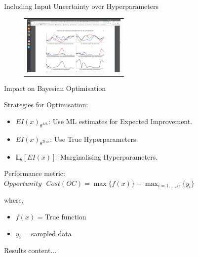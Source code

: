 \documentclass{beamer}
\begin{document}
\begin{frame}{Including Input Uncertainty over Hyperparameters}
\begin{figure}
	\centering
	\begin{tabular}{c}
		\includegraphics[width=5cm, trim={11.5cm 1cm 33cm 9cm},clip]{dif_hyp_params.png}
	\end{tabular}
\end{figure}
\end{frame}

\begin{frame}{Impact on Bayesian Optimisation}

Strategies for Optimisation:\\
\begin{itemize}
	\item $EI(x)_{\theta^{ML}}$: Use ML estimates for Expected Improvement.
	\item $EI(x)_{\theta^{True}}$: Use True Hyperparameters.
	\item $\mathbb{E}_{\theta}[EI(x)]$: Marginalising Hyperparameters.
\end{itemize}

Performance metric:\\
\vspace{3mm}
$Opportunity\text{ }Cost(OC) = \max\{f(x)\} - \max_{i=1,\dots,n}\{y_{i}\}$

where,
\begin{itemize}
	\item $f(x)$ = True function
	\item $y_{i}$ = sampled data
\end{itemize}

\end{frame}

\begin{frame}{Results}
content...
\end{frame}
\end{document}
